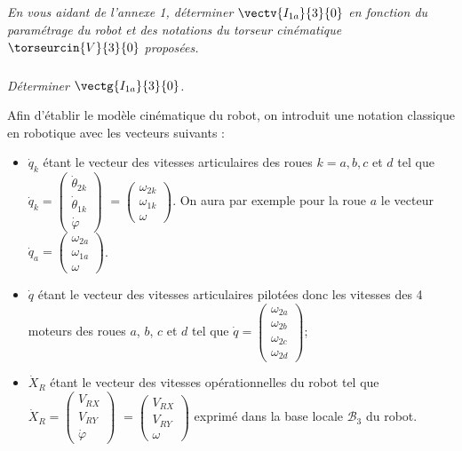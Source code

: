 \subparagraph{}
\textit{En vous aidant de l'annexe 1, déterminer $\vectv{I_{1a}}{3}{0}$ en fonction du paramétrage du robot et des notations du torseur cinématique $\torseurcin{V}{3}{0}$ proposées.}
\ifprof%
\begin{corrige}
\end{corrige}\else\fi

\subparagraph{}
\textit{Déterminer $\vectg{I_{1a}}{3}{0}$.}
\ifprof%
\begin{corrige}
\end{corrige}\else\fi


Afin d'établir le modèle cinématique du robot, on introduit une notation classique en robotique avec les vecteurs suivants :
 \begin{itemize}
\item  $\dot{q}_k$ étant le vecteur des vitesses articulaires des roues $k=a,b,c$ et $d$ tel que $\dot{q}_k =\begin{pmatrix}
\dot{\theta}_{2k} \\ \dot{\theta}_{1k} \\ \dot{\varphi} \end{pmatrix} $ $=\begin{pmatrix}
\omega_{2k} \\ \omega_{1k} \\ \omega \end{pmatrix} $. On aura par exemple pour la roue $a$ le vecteur 
$\dot{q}_a =\begin{pmatrix}
\omega_{2a} \\ \omega_{1a} \\ \omega \end{pmatrix} $.
\item  $\dot{q}$ étant le vecteur des vitesses articulaires pilotées donc les vitesses des 4 moteurs des roues $a$, $b$, $c$ et $d$ tel que $\dot{q} =\begin{pmatrix}
\omega_{2a} \\ \omega_{2b}\\ \omega_{2c}\\ \omega_{2d}\end{pmatrix} $;
\item $\dot{X}_R$ étant le vecteur des vitesses opérationnelles du robot tel que $\dot{X}_R=\begin{pmatrix}
V_{RX} \\ V_{RY}\\ \dot{\varphi}\end{pmatrix} $ $=\begin{pmatrix}
V_{RX} \\ V_{RY}\\ \omega\end{pmatrix} $ exprimé dans la base locale $\mathcal{B}_3$ du robot.
 \end{itemize}


